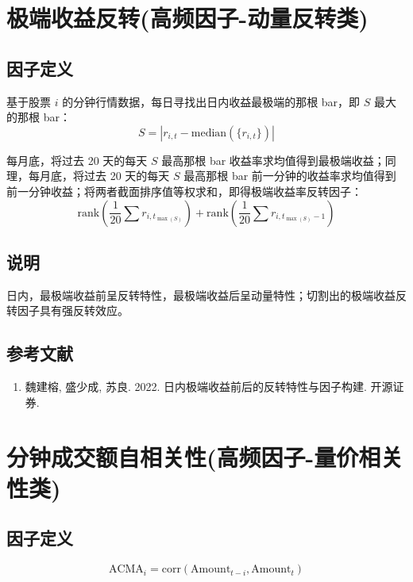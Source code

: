 \documentclass{article}
\begin{document}
\section{极端收益反转(高频因子-动量反转类)}

\subsection{因子定义}

基于股票 \( i \) 的分钟行情数据，每日寻找出日内收益最极端的那根 bar，即 \( S \) 最大的那根 bar：
\begin{equation}
    S = |r_{i,t} - \mathrm{median}(\{r_{i,t}\})|
\end{equation}

每月底，将过去 20 天的每天 \( S \) 最高那根 bar 收益率求均值得到最极端收益；同理，每月底，将过去 20 天的每天 \( S \) 最高那根 bar 前一分钟的收益率求均值得到前一分钟收益；将两者截面排序值等权求和，即得极端收益率反转因子：
\begin{equation}
    \mathrm{rank}\left(\frac{1}{20} \sum r_{i,t_{\max(S)}}\right) + \mathrm{rank}\left(\frac{1}{20} \sum r_{i,t_{\max(S)}-1}\right)
\end{equation}

\subsection{说明}
日内，最极端收益前呈反转特性，最极端收益后呈动量特性；切割出的极端收益反转因子具有强反转效应。

\subsection{参考文献}
\begin{enumerate}
    \item 魏建榕, 盛少成, 苏良. 2022. 日内极端收益前后的反转特性与因子构建. 开源证券.
\end{enumerate}

\section{分钟成交额自相关性(高频因子-量价相关性类)}

\subsection{因子定义}
\begin{equation}
    \mathrm{ACMA}_i = \mathrm{corr}(\mathrm{Amount}_{t-i}, \mathrm{Amount}_t)
\end{equation}
\end{document}
